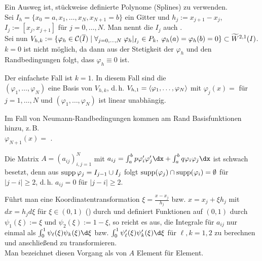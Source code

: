 \begin{Bem}
    Ein Ausweg ist, stückweise definierte Polynome (Splines) zu verwenden.\\
    Sei $I_h = \{x_0 = a, x_1, \dotsc, x_N, x_{N+1} = b\}$ ein Gitter und
    $h_j := x_{j+1} - x_j$, $I_j := [x_j, x_{j+1}]$ für $j = 0, \dotsc, N$.
    Man nennt die $I_j$ auch .\\
    Sei nun $V_{h,k} := \{\varphi_h \in \mathcal{C}(\overline{I}) \;|\;
    \forall_{j=0,\dotsc,N}\; \varphi_h|_{I_j} \in P_k,\;
    \varphi_h(a) = \varphi_h(b) = 0\} \subset \widetilde{W}^{2,1}(I)$.\\
    $k = 0$ ist nicht möglich, da dann aus der Stetigkeit der $\varphi_h$
    und den Randbedingungen folgt, dass $\varphi_h \equiv 0$ ist.
    
    Der einfachste Fall ist $k = 1$.
    In diesem Fall sind die \\
    $(\varphi_1, \dotsc, \varphi_N)$ eine Basis von $V_{h,k}$, d.\,h.
    $V_{h,1} = \left\langle{\varphi_1, \dotsc, \varphi_N}\right\rangle$
    mit $\varphi_j(x) =$  für $j = 1, \dotsc, N$
    und $(\varphi_1, \dotsc, \varphi_N)$ ist linear unabhängig.
    
    Im Fall von Neumann-Randbedingungen kommen am Rand Basisfunktionen hinzu,
    z.\,B.\\
    $\varphi_{N+1}(x) =$ .
    
    Die Matrix $A = (a_{ij})_{i,j=1}^N$ mit
    $a_{ij} = \int_a^b p\varphi_i'\varphi_j'\dx +
    \int_a^b q\varphi_i\varphi_j\dx$ ist schwach besetzt, denn aus
    $\operatorname{supp} \varphi_j = I_{j-1} \cup I_j$ folgt
    $\operatorname{supp} (\varphi_j) \cap \operatorname{supp}(\varphi_i) = \emptyset$ für $|j - i| \ge 2$,
    d.\,h. $a_{ij} = 0$ für $|j - i| \ge 2$.
    
    Führt man eine Koordinatentransformation
    $\xi = \frac{x - x_j}{h_j}$ bzw. $x = x_j + \xi h_j$ mit $dx = h_j d\xi$
    für $\xi \in (0, 1)$ ()
    durch und definiert Funktionen auf $(0, 1)$ durch
    $\psi_1(\xi) := \xi$ und $\psi_2(\xi) := 1 - \xi$, so reicht es aus,
    die Integrale für $a_{ij}$ nur einmal als
    $\int_0^1 \psi_\ell(\xi) \psi_k(\xi) \d\xi$ bzw.
    $\int_0^1 \psi_\ell'(\xi) \psi_k'(\xi) \d\xi$ für $\ell, k = 1, 2$
    zu berechnen und anschließend zu transformieren.\\
    Man bezeichnet diesen Vorgang als  von $A$
    Element für Element.
\end{Bem}

